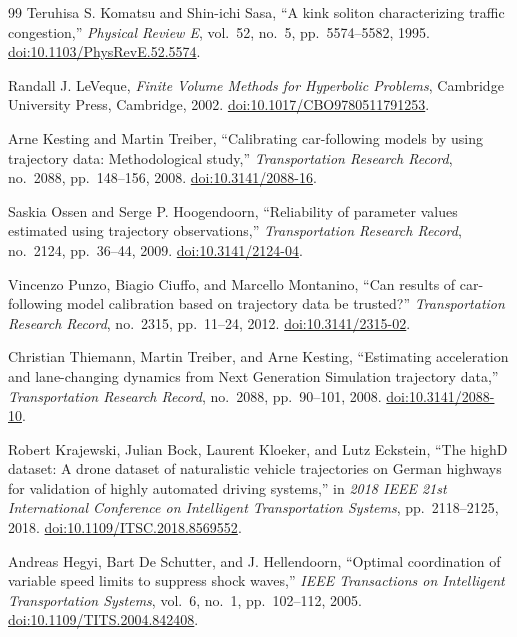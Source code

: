 \documentclass[11pt,a4paper,openany]{book}
\numberwithin{equation}{chapter}
\numberwithin{figure}{chapter}
\numberwithin{table}{chapter}
\begin{document}
\begin{thebibliography}{99}
Teruhisa S. Komatsu and Shin-ichi Sasa,
``A kink soliton characterizing traffic congestion,''
\emph{Physical Review E}, vol.~52, no.~5, pp.~5574--5582, 1995.
\href{https://doi.org/10.1103/PhysRevE.52.5574}{doi:10.1103/PhysRevE.52.5574}.

Randall J. LeVeque,
\emph{Finite Volume Methods for Hyperbolic Problems},
Cambridge University Press, Cambridge, 2002.
\href{https://doi.org/10.1017/CBO9780511791253}{doi:10.1017/CBO9780511791253}.

Arne Kesting and Martin Treiber,
``Calibrating car-following models by using trajectory data: Methodological study,''
\emph{Transportation Research Record}, no.~2088, pp.~148--156, 2008.
\href{https://doi.org/10.3141/2088-16}{doi:10.3141/2088-16}.

Saskia Ossen and Serge P. Hoogendoorn,
``Reliability of parameter values estimated using trajectory observations,''
\emph{Transportation Research Record}, no.~2124, pp.~36--44, 2009.
\href{https://doi.org/10.3141/2124-04}{doi:10.3141/2124-04}.

Vincenzo Punzo, Biagio Ciuffo, and Marcello Montanino,
``Can results of car-following model calibration based on trajectory data be trusted?''
\emph{Transportation Research Record}, no.~2315, pp.~11--24, 2012.
\href{https://doi.org/10.3141/2315-02}{doi:10.3141/2315-02}.

Christian Thiemann, Martin Treiber, and Arne Kesting,
``Estimating acceleration and lane-changing dynamics from Next Generation Simulation trajectory data,''
\emph{Transportation Research Record}, no.~2088, pp.~90--101, 2008.
\href{https://doi.org/10.3141/2088-10}{doi:10.3141/2088-10}.

Robert Krajewski, Julian Bock, Laurent Kloeker, and Lutz Eckstein,
``The highD dataset: A drone dataset of naturalistic vehicle trajectories on German highways for validation of highly automated driving systems,''
in \emph{2018 IEEE 21st International Conference on Intelligent Transportation Systems}, pp.~2118--2125, 2018.
\href{https://doi.org/10.1109/ITSC.2018.8569552}{doi:10.1109/ITSC.2018.8569552}.

Andreas Hegyi, Bart De Schutter, and J. Hellendoorn,
``Optimal coordination of variable speed limits to suppress shock waves,''
\emph{IEEE Transactions on Intelligent Transportation Systems}, vol.~6, no.~1, pp.~102--112, 2005.
\href{https://doi.org/10.1109/TITS.2004.842408}{doi:10.1109/TITS.2004.842408}.


\end{thebibliography}
\end{document}
